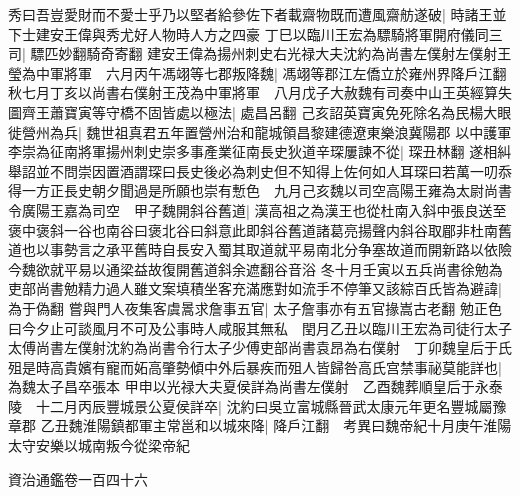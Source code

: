 秀曰吾豈愛財而不愛士乎乃以堅者給參佐下者載齋物既而遭風齋舫遂破|{
	時諸王並下士建安王偉與秀尤好人物時人方之四豪}
丁巳以臨川王宏為驃騎將軍開府儀同三司|{
	驃匹妙翻騎奇寄翻}
建安王偉為揚州刺史右光禄大夫沈約為尚書左僕射左僕射王瑩為中軍將軍　六月丙午馮翊等七郡叛降魏|{
	馮翊等郡江左僑立於雍州界降戶江翻}
秋七月丁亥以尚書右僕射王茂為中軍將軍　八月戊子大赦魏有司奏中山王英經算失圖齊王蕭寶寅等守橋不固皆處以極法|{
	處昌呂翻}
己亥詔英寶寅免死除名為民楊大眼徙營州為兵|{
	魏世祖真君五年置營州治和龍城領昌黎建德遼東樂浪冀陽郡}
以中護軍李崇為征南將軍揚州刺史崇多事產業征南長史狄道辛琛屢諫不從|{
	琛丑林翻}
遂相糾舉詔並不問崇因置酒謂琛曰長史後必為刺史但不知得上佐何如人耳琛曰若萬一叨忝得一方正長史朝夕聞過是所願也崇有慙色　九月己亥魏以司空高陽王雍為太尉尚書令廣陽王嘉為司空　甲子魏開斜谷舊道|{
	漢高祖之為漢王也從杜南入斜中張良送至褒中褒斜一谷也南谷曰褒北谷曰斜意此即斜谷舊道諸葛亮揚聲内斜谷取郿非杜南舊道也以事勢言之承平舊時自長安入蜀其取道就平易南北分争塞故道而開新路以依險今魏欲就平易以通梁益故復開舊道斜余遮翻谷音浴}
冬十月壬寅以五兵尚書徐勉為吏部尚書勉精力過人雖文案填積坐客充滿應對如流手不停筆又該綜百氏皆為避諱|{
	為于偽翻}
嘗與門人夜集客虞暠求詹事五官|{
	太子詹事亦有五官掾嵩古老翻}
勉正色曰今夕止可談風月不可及公事時人咸服其無私　閏月乙丑以臨川王宏為司徒行太子太傅尚書左僕射沈約為尚書令行太子少傅吏部尚書袁昂為右僕射　丁卯魏皇后于氏殂是時高貴嬪有寵而妬高肇勢傾中外后暴疾而殂人皆歸咎高氏宫禁事祕莫能詳也|{
	為魏太子昌卒張本}
甲申以光禄大夫夏侯詳為尚書左僕射　乙酉魏葬順皇后于永泰陵　十二月丙辰豐城景公夏侯詳卒|{
	沈約曰吳立富城縣晉武太康元年更名豐城屬豫章郡}
乙丑魏淮陽鎮都軍主常邕和以城來降|{
	降戶江翻　考異曰魏帝紀十月庚午淮陽太守安樂以城南叛今從梁帝紀}


資治通鑑卷一百四十六
